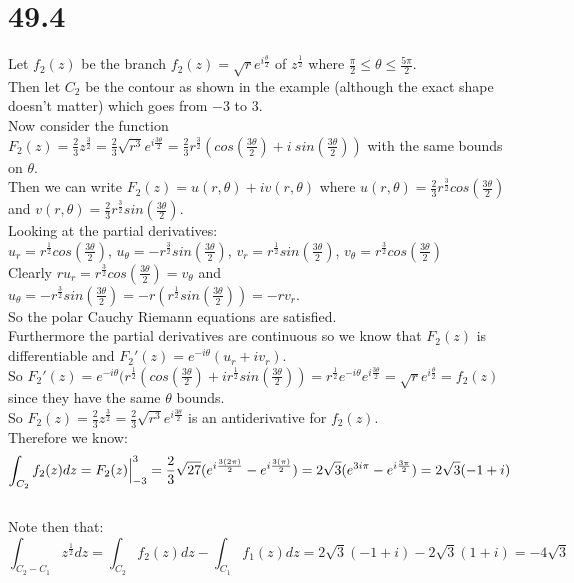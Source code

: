 \documentclass{article}
\begin{document}
\section*{49.4}
\begin{center}
    \doublespacing
    Let $f_2 (z)$ be the branch $f_2 (z) =\sqrt{r} e^{i\frac{\theta}{2}}$ of $z^{\frac{1}{2}}$ where $\frac{\pi}{2}\leq\theta\leq\frac{5\pi}{2}$.
    \\Then let $C_2$ be the contour as shown in the example (although the exact shape doesn't matter) which goes from $-3$ to 3.
    \break
    \\Now consider the function $F_2 (z) =\frac{2}{3} z^{\frac{3}{2}} =\frac{2}{3}\sqrt{r^3} e^{i\frac{3\theta}{2}} =\frac{2}{3} r^{\frac{3}{2}}(cos(\frac{3\theta}{2}) + i\:sin(\frac{3\theta}{2}))$ with the same bounds on $\theta$.
    \\Then we can write $F_2 (z) = u(r,\theta) + iv(r,\theta)$ where $u(r,\theta) =\frac{2}{3} r^{\frac{3}{2}} cos(\frac{3\theta}{2})$ and $v(r,\theta) =\frac{2}{3} r^{\frac{3}{2}} sin(\frac{3\theta}{2})$.
    \\Looking at the partial derivatives:
    \\$u_r =r^{\frac{1}{2}} cos(\frac{3\theta}{2})$, $u_{\theta} = -r^{\frac{3}{2}} sin(\frac{3\theta}{2})$, $v_r = r^{\frac{1}{2}} sin(\frac{3\theta}{2})$, $v_{\theta} = r^{\frac{3}{2}} cos(\frac{3\theta}{2})$
    \\Clearly $r u_r = r^{\frac{3}{2}} cos(\frac{3\theta}{2}) = v_{\theta}$ and $u_{\theta} = -r^{\frac{3}{2}} sin(\frac{3\theta}{2}) = -r(r^{\frac{1}{2}} sin(\frac{3\theta}{2})) = -r v_r$.
    \\So the polar Cauchy Riemann equations are satisfied.
    \\Furthermore the partial derivatives are continuous so we know that $F_2 (z)$ is differentiable and $F_2 '(z) = e^{-i\theta} (u_r + iv_r)$.
    \\So $F_2 '(z) = e^{-i\theta} (r^{\frac{1}{2}} (cos(\frac{3\theta}{2}) + i r^{\frac{1}{2}} sin(\frac{3\theta}{2})) = r^{\frac{1}{2}} e^{-i\theta} e^{i\frac{3\theta}{2}} =\sqrt{r} e^{i\frac{\theta}{2}} = f_2 (z)$ since they have the same $\theta$ bounds.
    \\So $F_2 (z) =\frac{2}{3} z^{\frac{3}{2}} =\frac{2}{3}\sqrt{r^3} e^{i\frac{3\theta}{2}}$ is an antiderivative for $f_2 (z)$.
    \break
    \\Therefore we know:
    \[\int _{C_2} f_2 (z) dz = F_2 (z)\Big{|}_{-3}^3 =\frac{2}{3}\sqrt{27} (e^{i\frac{3(2\pi)}{2}} - e^{i\frac{3(\pi)}{2}}) = 2\sqrt{3} (e^{3i\pi} - e^{i\frac{3\pi}{2}}) = 2\sqrt{3} (-1 + i)\]
    \qedsymbol
    \\Note then that:
    \[\int _{C_2 - C_1} z^{\frac{1}{2}} dz =\int _{C_2} f_2 (z) dz -\int _{C_1} f_1 (z) dz = 2\sqrt{3}(-1 + i) - 2\sqrt{3}(1 + i) = -4\sqrt{3}\]
\end{center}
\end{document}
